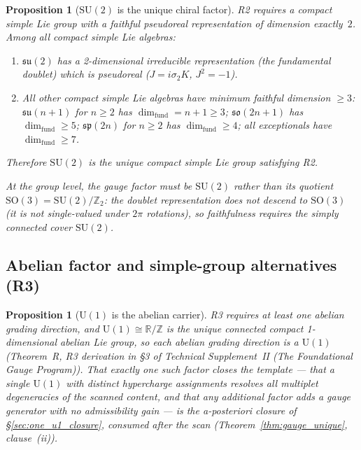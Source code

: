 \documentclass[11pt]{article}
\newtheorem{proposition}[theorem]{Proposition}
\theoremstyle{definition}
\newcommand{\SU}{\mathrm{SU}}
\newcommand{\U}{\mathrm{U}}
\newcommand{\TSII}{Technical Supplement~II (\emph{The Foundational Gauge Program})}
\begin{document}
\begin{proposition}[$\SU(2)$ is the unique chiral factor]\label{prop:R2_unique}
R2 requires a compact simple Lie group with a faithful pseudoreal
representation of dimension exactly~$2$.  Among all compact simple Lie
algebras:
\begin{enumerate}[label=(\roman*),nosep]
  \item $\mathfrak{su}(2)$ has a 2-dimensional irreducible representation
        (the fundamental doublet) which is pseudoreal
        ($J = i\sigma_2 K$, $J^2 = -1$).
  \item All other compact simple Lie algebras have minimum faithful
        dimension $\ge 3$: $\mathfrak{su}(n+1)$ for $n \ge 2$ has
        $\dim_{\mathrm{fund}} = n + 1 \ge 3$; $\mathfrak{so}(2n+1)$
        has $\dim_{\mathrm{fund}} \ge 5$; $\mathfrak{sp}(2n)$ for $n \ge 2$
        has $\dim_{\mathrm{fund}} \ge 4$; all exceptionals have
        $\dim_{\mathrm{fund}} \ge 7$.
\end{enumerate}
Therefore $\SU(2)$ is the unique compact simple Lie group satisfying R2.

At the group level, the gauge factor must be $\SU(2)$ rather than its
quotient $\mathrm{SO}(3) = \SU(2)/\mathbb{Z}_2$: the doublet
representation does not descend to $\mathrm{SO}(3)$ (it is not
single-valued under $2\pi$ rotations), so faithfulness requires
the simply connected cover $\SU(2)$.
\end{proposition}


\subsection{Abelian factor and simple-group alternatives (R3)}
\label{sec:R3_simple}

\begin{proposition}[$\U(1)$ is the abelian carrier]\label{prop:R3_unique}
R3 requires at least one abelian grading direction, and
$\U(1) \cong \mathbb{R}/\mathbb{Z}$ is the unique connected compact
1-dimensional abelian Lie group, so each abelian grading direction is
a $\U(1)$ (Theorem~R, R3 derivation in \S3 of \TSII{}).  That
\emph{exactly one} such factor closes the template --- that a single
$\U(1)$ with distinct hypercharge assignments resolves all multiplet
degeneracies of the scanned content, and that any additional factor
adds a gauge generator with no admissibility gain --- is the
a-posteriori closure of \S\ref{sec:one_u1_closure}, consumed after
the scan (Theorem~\ref{thm:gauge_unique}, clause~(ii)).
\end{proposition}
\end{document}
